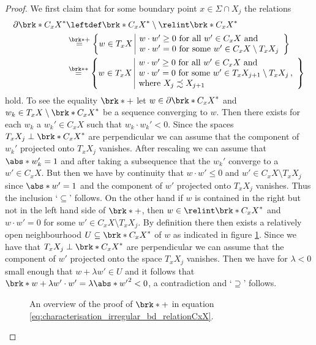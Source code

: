 \begin{proof}
  We first claim that for some boundary point $x\in\Sigma\cap X_j$ the relations
  \begin{align}
    \begin{aligned}
    \partial\brk*{C_xX}^* &\leftdef\brk*{C_xX}^*\setminus\relint\brk*{C_xX}^*\\
    &\stackrel{\brk*{+}}{=}\left\{w\in T_xX\;\begin{array}{|l}
      w\cdot w'\geq0\text{ for all }w'\in C_xX\text{ and }\\
      w\cdot w'=0\text{ for some }w'\in C_xX\setminus T_xX_{j}
    \end{array}\right\}\\
    &\stackrel{\brk*{*}}{=}\left\{w\in T_xX\;\begin{array}{|l}
      w\cdot w'\geq0\text{ for all }w'\in C_xX\text{ and }\\
      w\cdot w'=0\text{ for some }w'\in T_xX_{j+1}\setminus T_xX_{j}\,,\\
      \text{where }X_{j}\precsim X_{j+1}
    \end{array}\right\}
    \end{aligned}
    \label{eq:characterisation_irregular_bd_relationCxX}
  \end{align}
  hold.
  To see the equality $\brk*{+}$ let $w\in\partial \brk*{C_xX}^*$
  and $w_k\in T_xX\setminus\brk*{C_xX}^*$ be a sequence converging to $w$. Then there
  exists for each $w_k$ a $w_k'\in C_xX$ such that $w_k\cdot w_k'<0$.
  Since the spaces $T_xX_j\perp\brk*{C_xX}^*$ are perpendicular we can assume that the component
  of $w_k'$ projected onto $T_xX_j$ vanishes.
  After rescaling we can assume that $\abs*{w_k'}=1$
  and after taking a subsequence that the $w_k'$ converge to a $w'\in C_xX$. But then we have by continuity that
  $w\cdot w'\leq 0$ and $w'\in C_xX\setminus T_xX_j$ since $\abs*{w'}=1$ and the component of $w'$ projected onto $T_xX_j$ vanishes.
  Thus the inclusion `$\subseteq$' follows.
  On the other hand if $w$ is contained in the right but not in the left hand side of $\brk*{+}$, then $w\in\relint\brk*{C_xX}^*$
  and $w\cdot w'=0$ for some $w'\in C_xX\setminus T_xX_j$.
  By definition there then exists a relatively open neighbourhood $U\subseteq \brk*{C_xX}^*$ of $w$
  as indicated in figure \ref{fi:irregularCPs_X12}.
  Since we have that $T_xX_j\perp \brk*{C_xX}^*$ are perpendicular we can assume that the component of $w'$ projected onto the space $T_xX_j$
  vanishes.
  Then we have for $\lambda<0$ small enough that $w+\lambda w'\in U$
  and it follows that $\brk*{w+\lambda w'}\cdot w'=\lambda\abs*{w'}^2<0$, a contradiction
  and `$\supseteq$' follows.
  \begin{figure}
    \centering
    
    \caption{An overview of the proof of $\brk*{+}$ in equation \eqref{eq:characterisation_irregular_bd_relationCxX}.}
    \label{fi:irregularCPs_X12}
  \end{figure}


\end{proof}
